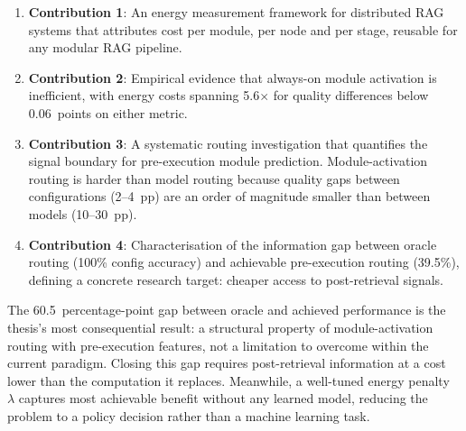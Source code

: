 \begin{enumerate}
    \item \textbf{Contribution 1}: An energy measurement framework for distributed RAG
          systems that attributes cost per module, per node and per
          stage, reusable for any modular RAG pipeline.
    \item \textbf{Contribution 2}: Empirical evidence that always-on module activation
          is inefficient, with energy costs spanning 5.6$\times$ for
          quality differences below 0.06~points on either metric.
    \item \textbf{Contribution 3}: A systematic routing investigation that quantifies
          the signal boundary for pre-execution module prediction.
          Module-activation routing is harder than model routing because
          quality gaps between configurations (2--4~pp) are an order of
          magnitude smaller than between models (10--30~pp).
    \item \textbf{Contribution 4}: Characterisation of the information gap between
          oracle routing (100\% config accuracy) and achievable
          pre-execution routing (39.5\%), defining a concrete research
          target: cheaper access to post-retrieval signals.
\end{enumerate}

The 60.5~percentage-point gap between oracle and achieved performance
is the thesis's most consequential result: a structural property of
module-activation routing with pre-execution features, not a limitation
to overcome within the current paradigm.  Closing this gap requires
post-retrieval information at a cost lower than the computation it
replaces.  Meanwhile, a well-tuned energy penalty~$\lambda$ captures
most achievable benefit without any learned model, reducing the problem
to a policy decision rather than a machine learning task.
